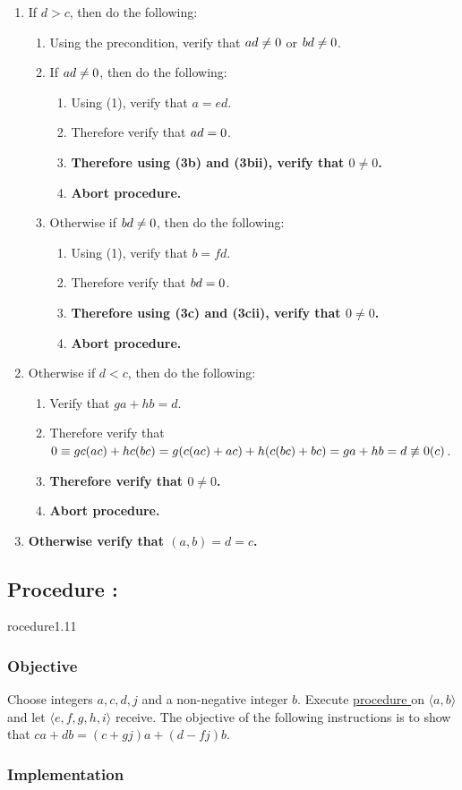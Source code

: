 \documentclass{article}
\let\div\relax\DeclareMathOperator{\div}{div}
\let\mod\relax\DeclareMathOperator{\mod}{mod}
\newcounter{procedure}[part]
\newcommand{\procedure}[1]{\subsection*{Procedure \thepart:\theprocedure}\label{sec:procedure #1}\global\expandafter\edef\csname procedure#1\endcsname{\thepart:\theprocedure}\addtocounter{procedure}{1}}
\newcommand{\objective}{\subsubsection*{Objective}}
\newcommand{\implementation}{\subsubsection*{Implementation}}
\newcommand{\procedurehr}[1]{\hyperref[sec:procedure #1]{procedure \expandafter\csname procedure#1\endcsname}}
\begin{document}
\begin{multicols}{2}
\begin{enumerate}
					\item If $d>c$, then do the following:
					\begin{enumerate}
						\item Using the precondition, verify that $a\mod d\ne 0$ or $b\mod d\ne 0$.
						\item If $a\mod d\ne 0$, then do the following:
						\begin{enumerate}
							\item Using (1), verify that $a=ed$.
							\item Therefore verify that $a\mod d=0$.
							\item \textbf{Therefore using (3b) and (3bii), verify that $0\ne 0$.}
							\item \textbf{Abort procedure.}
						\end{enumerate}
						\item Otherwise if $b\mod d\ne 0$, then do the following:
						\begin{enumerate}
							\item Using (1), verify that $b=fd$.
							\item Therefore verify that $b\mod d=0$.
							\item \textbf{Therefore using (3c) and (3cii), verify that $0\ne 0$.}
							\item \textbf{Abort procedure.}
						\end{enumerate}
					\end{enumerate}
					\item Otherwise if $d<c$, then do the following:
					\begin{enumerate}
						\item Verify that $ga+hb=d$.
						\item Therefore verify that $0\equiv gc(a\div c)+hc(b\div c)=g(c(a\div c)+a\mod c)+h(c(b\div c)+b\mod c)=ga+hb=d\not\equiv 0(\mod c)$.
						\item \textbf{Therefore verify that $0\ne 0$.}
						\item \textbf{Abort procedure.}
					\end{enumerate}
					\item \textbf{Otherwise verify that $(a,b)=d=c$.}
				\end{enumerate}
		\procedure{1.11}
			\objective
				Choose integers $a,c,d,j$ and a non-negative integer $b$. Execute \procedurehr{1.09} on $\langle a,b\rangle$ and let $\langle e,f,g,h,i\rangle$ receive. The objective of the following instructions is to show that $ca+db=(c+gj)a+(d-fj)b$.
			\implementation

\end{multicols}
\end{document}
